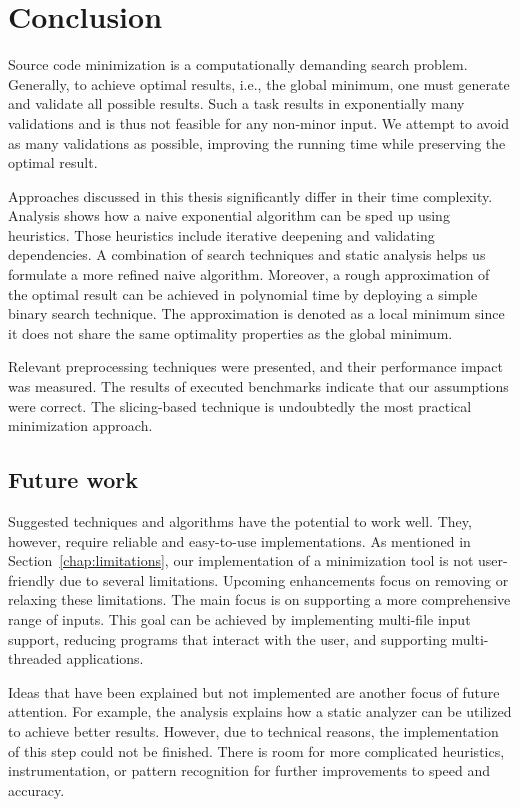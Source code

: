 \chapter{Conclusion}


Source code minimization is a computationally demanding search problem. 
Generally, to achieve optimal results, i.e., the global minimum, one must 
generate and validate all possible results. 
Such a task results in exponentially many validations and is thus not feasible 
for any non-minor input. 
We attempt to avoid as many validations as possible, improving the running 
time while preserving the optimal result.

Approaches discussed in this thesis significantly differ in their time complexity. 
Analysis shows how a naive exponential algorithm can be sped up using 
heuristics. Those heuristics include iterative deepening and validating 
dependencies. 
A combination of search techniques and static analysis helps us formulate 
a more refined naive algorithm. 
Moreover, a rough approximation of the optimal result can be achieved 
in polynomial time by deploying a simple binary search technique. 
The approximation is denoted as a local minimum since it does not share 
the same optimality properties as the global minimum.

Relevant preprocessing techniques were presented, and their performance impact 
was measured. 
The results of executed benchmarks indicate that our assumptions were 
correct. 
The slicing-based technique is undoubtedly the most practical minimization 
approach.

\section{Future work}

Suggested techniques and algorithms have the potential to work well. 
They, however, require reliable and easy-to-use implementations. 
As mentioned in Section~\ref{chap:limitations}, our implementation of 
a minimization tool is not user-friendly due to several limitations. 
Upcoming enhancements focus on removing or relaxing these limitations. 
The main focus is on supporting a more comprehensive range of inputs. 
This goal can be achieved by implementing multi-file input support, reducing 
programs that interact with the user, and supporting multi-threaded 
applications.

Ideas that have been explained but not implemented are another focus of 
future attention. 
For example, the analysis explains how a static analyzer can be utilized to 
achieve better results. 
However, due to technical reasons, the implementation of this step could not 
be finished. 
There is room for more complicated heuristics, instrumentation, or pattern 
recognition for further improvements to speed and accuracy.


